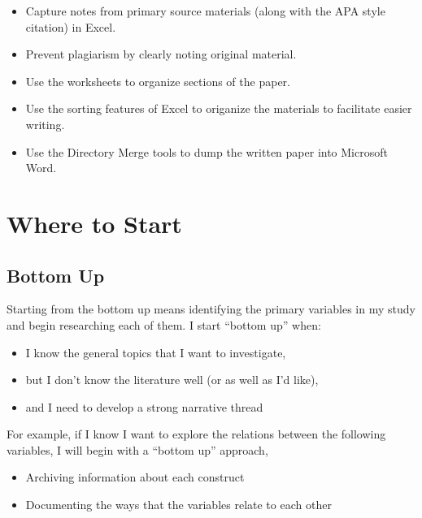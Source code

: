 \documentclass[
  english,
]{book}
\providecommand{\tightlist}{%
  \setlength{\itemsep}{0pt}\setlength{\parskip}{0pt}}
\begin{document}
\begin{itemize}
\tightlist
\item
  Capture notes from primary source materials (along with the APA style citation) in Excel.
\item
  Prevent plagiarism by clearly noting original material.
\item
  Use the worksheets to organize sections of the paper.
\item
  Use the sorting features of Excel to origanize the materials to facilitate easier writing.
\item
  Use the Directory Merge tools to dump the written paper into Microsoft Word.
\end{itemize}

\hypertarget{where-to-start}{%
\section{Where to Start}\label{where-to-start}}

\hypertarget{bottom-up}{%
\subsection{Bottom Up}\label{bottom-up}}

Starting from the bottom up means identifying the primary variables in my study and begin researching each of them. I start ``bottom up'' when:

\begin{itemize}
\tightlist
\item
  I know the general topics that I want to investigate,
\item
  but I don't know the literature well (or as well as I'd like),
\item
  and I need to develop a strong narrative thread
\end{itemize}

For example, if I know I want to explore the relations between the following variables, I will begin with a ``bottom up'' approach,

\begin{itemize}
\tightlist
\item
  Archiving information about each construct
\item
  Documenting the ways that the variables relate to each other
\end{itemize}
\end{document}
